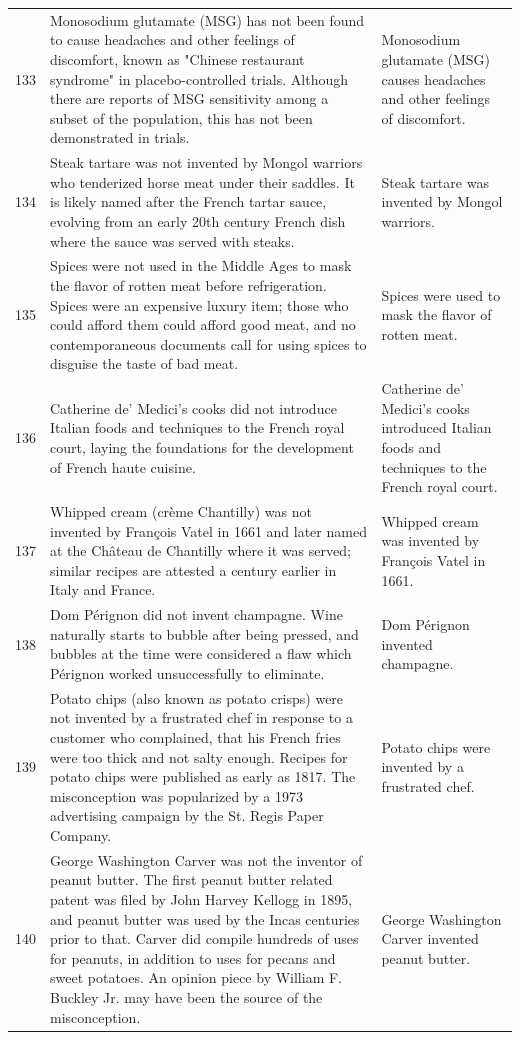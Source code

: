\begin{tabular}{c|p{}|p{}}
133 & Monosodium glutamate (MSG) has not been found to cause headaches and other feelings of discomfort, known as "Chinese restaurant syndrome" in placebo-controlled trials. Although there are reports of MSG sensitivity among a subset of the population, this has not been demonstrated in trials. & Monosodium glutamate (MSG) causes headaches and other feelings of discomfort. \\
134 & Steak tartare was not invented by Mongol warriors who tenderized horse meat under their saddles. It is likely named after the French tartar sauce, evolving from an early 20th century French dish where the sauce was served with steaks. & Steak tartare was invented by Mongol warriors. \\
135 & Spices were not used in the Middle Ages to mask the flavor of rotten meat before refrigeration. Spices were an expensive luxury item; those who could afford them could afford good meat, and no contemporaneous documents call for using spices to disguise the taste of bad meat. & Spices were used to mask the flavor of rotten meat. \\
136 & Catherine de' Medici's cooks did not introduce Italian foods and techniques to the French royal court, laying the foundations for the development of French haute cuisine. & Catherine de' Medici's cooks introduced Italian foods and techniques to the French royal court. \\
137 & Whipped cream (crème Chantilly) was not invented by François Vatel in 1661 and later named at the Château de Chantilly where it was served; similar recipes are attested a century earlier in Italy and France. & Whipped cream was invented by François Vatel in 1661. \\
138 & Dom Pérignon did not invent champagne. Wine naturally starts to bubble after being pressed, and bubbles at the time were considered a flaw which Pérignon worked unsuccessfully to eliminate. & Dom Pérignon invented champagne. \\
139 & Potato chips (also known as potato crisps) were not invented by a frustrated chef in response to a customer who complained, that his French fries were too thick and not salty enough. Recipes for potato chips were published as early as 1817. The misconception was popularized by a 1973 advertising campaign by the St. Regis Paper Company. & Potato chips were invented by a frustrated chef. \\
140 & George Washington Carver was not the inventor of peanut butter. The first peanut butter related patent was filed by John Harvey Kellogg in 1895, and peanut butter was used by the Incas centuries prior to that. Carver did compile hundreds of uses for peanuts, in addition to uses for pecans and sweet potatoes. An opinion piece by William F. Buckley Jr. may have been the source of the misconception. & George Washington Carver invented peanut butter. \\

\end{tabular}
